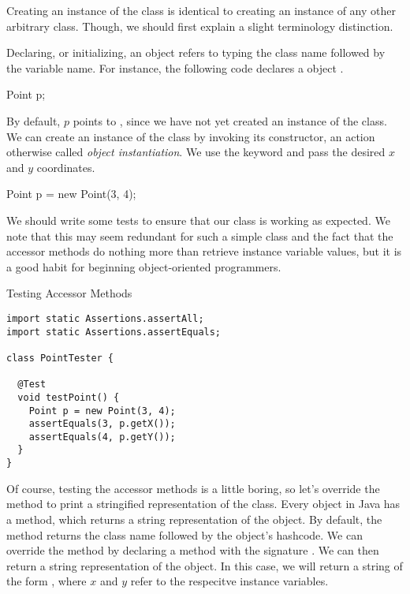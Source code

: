 Creating an instance of the  class is identical to creating an instance of any other arbitrary class. Though, we should first explain a slight terminology distinction.

Declaring, or initializing, an object refers to typing the class name followed by the variable name. For instance, the following code declares a  object .

\begin{verbnobox}[\footnotesize]
Point p;
\end{verbnobox}

By default, $p$ points to , since we have not yet created an instance of the  class. We can create an instance of the  class by invoking its constructor, an action otherwise called \textit{object instantiation}. We use the  keyword and pass the desired $x$ and $y$ coordinates. 

\begin{verbnobox}[\footnotesize]
Point p = new Point(3, 4);
\end{verbnobox}

We should write some tests to ensure that our  class is working as expected. We note that this may seem redundant for such a simple class and the fact that the accessor methods do nothing more than retrieve instance variable values, but it is a good habit for beginning object-oriented programmers.

\begin{cl}[]{Testing Accessor Methods}
\begin{lstlisting}[language=MyJava]
import static Assertions.assertAll;
import static Assertions.assertEquals;

class PointTester {
  
  @Test
  void testPoint() {
    Point p = new Point(3, 4);
    assertEquals(3, p.getX());
    assertEquals(4, p.getY());
  }
}
\end{lstlisting}
\end{cl}

Of course, testing the accessor methods is a little boring, so let's override the  method to print a stringified representation of the  class. Every object in Java has a  method, which returns a string representation of the object. By default, the  method returns the class name followed by the object's hashcode. We can override the  method by declaring a  method with the signature . We can then return a string representation of the object. In this case, we will return a string of the form , where $x$ and $y$ refer to the respecitve instance variables.

